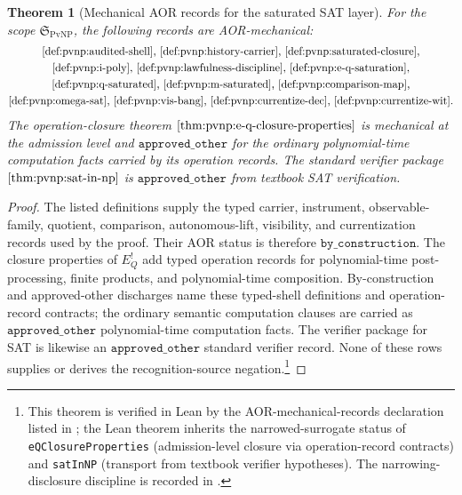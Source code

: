 \documentclass[11pt]{article}
\newcommand{\EQbang}{E^{!}_{Q}}
\newtheorem{theorem}{Theorem}[section]
\theoremstyle{definition}
\begin{document}
\begin{theorem}[Mechanical AOR records for the saturated SAT layer]
\label{thm:pvnp:aor:mechanical-records}
For the scope \(\mathfrak S_{\mathrm{PvNP}}\), the following records
are AOR-mechanical:
\[
\begin{gathered}
  \text{\Cref{def:pvnp:audited-shell}, }
  \text{\Cref{def:pvnp:history-carrier}, }
  \text{\Cref{def:pvnp:saturated-closure},}\\
  \text{\Cref{def:pvnp:i-poly}, }
  \text{\Cref{def:pvnp:lawfulness-discipline}, }
  \text{\Cref{def:pvnp:e-q-saturation},}\\
  \text{\Cref{def:pvnp:q-saturated}, }
  \text{\Cref{def:pvnp:m-saturated}, }
  \text{\Cref{def:pvnp:comparison-map},}\\
  \text{\Cref{def:pvnp:omega-sat}, }
  \text{\Cref{def:pvnp:vis-bang}, }
  \text{\Cref{def:pvnp:currentize-dec}, }
  \text{\Cref{def:pvnp:currentize-wit}.}
\end{gathered}
\]
The operation-closure theorem \(\Cref{thm:pvnp:e-q-closure-properties}\)
is mechanical at the admission level and \(\texttt{approved\_other}\)
for the ordinary polynomial-time computation facts carried by its
operation records.  The standard verifier package
\(\Cref{thm:pvnp:sat-in-np}\) is \(\texttt{approved\_other}\) from
textbook SAT verification.
\end{theorem}

\begin{proof}
The listed definitions supply the typed carrier, instrument,
observable-family, quotient, comparison, autonomous-lift, visibility,
and currentization records used by the proof.  Their AOR status is
therefore \(\texttt{by\_construction}\).  The closure properties of
\(\EQbang\) add typed operation records for polynomial-time
post-processing, finite products, and polynomial-time composition.
By-construction and approved-other discharges name these typed-shell
definitions and operation-record contracts; the ordinary semantic
computation clauses are carried as \(\texttt{approved\_other}\)
polynomial-time computation facts.  The verifier package for SAT is
likewise an \(\texttt{approved\_other}\) standard verifier record.
None of these rows supplies or derives the recognition-source
negation.\footnote{This theorem is verified in Lean by the
AOR-mechanical-records declaration listed in ;
the Lean theorem inherits the narrowed-surrogate status of
\texttt{eQClosureProperties} (admission-level closure via
operation-record contracts) and \texttt{satInNP} (transport from
textbook verifier hypotheses).  The narrowing-disclosure discipline is
recorded in .}
\end{proof}
\end{document}
